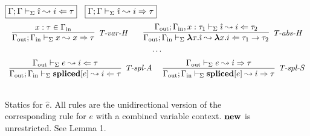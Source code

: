 \newcommand{\Gin}{\Gamma_{\text{in}}}
\begin{figure}[t]
$\fbox{$\Gamma; \Gamma \vdash_\Sigma \hat{\imath} \leadsto i \Leftarrow \tau$}$~
$\fbox{$\Gamma; \Gamma \vdash_\Sigma \hat{\imath} \leadsto i \Rightarrow \tau$}$
\[
\begin{array}{c}
\infer[\textit{T-var-H}]
	{\Gout; \Gin \vdash_\Sigma x \leadsto x \Rightarrow\tau } 
	{x:\tau \in \Gin }
~~~~~~
\infer[\textit{T-abs-H}]
	{\Gout; \Gin \vdash_\Sigma  \boldsymbol\lambda x . \hat{\imath} \leadsto \boldsymbol\lambda x .i \Leftarrow \tau_1 \rightarrow \tau_2 } 
	{\Gout; \Gin, x:\tau_1 \vdash_\Sigma \hat{\imath}\leadsto i\Leftarrow \tau_2 }\\[1ex]
\cdots\\[1ex]
\infer[\textit{T-spl-A}]
	{\Gout; \Gin \vdash_\Sigma \keyw{spliced}[e] \leadsto i \Leftarrow \tau}
	{\Gout \vdash_\Sigma e \leadsto i \Leftarrow \tau}~~~~

\infer[\textit{T-spl-S}]
	{\Gout; \Gin \vdash_\Sigma \keyw{spliced}[e] \leadsto i \Rightarrow \tau}
	{\Gout \vdash_\Sigma e \leadsto i \Rightarrow \tau}\\[3ex]
\end{array}
\]
\vspace{-15px}
\caption{Statics for $\hat e$. All rules are the unidirectional version of the corresponding rule for $e$ with a combined variable context. $\textbf{new}$ is unrestricted. See Lemma 1.}
\vspace{-10px}
\label{fig:staticsHat}
\end{figure}
